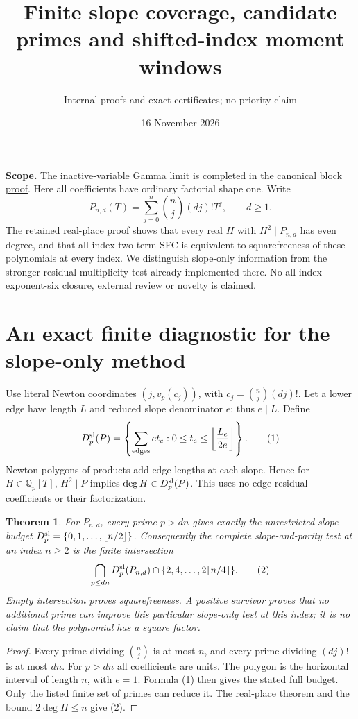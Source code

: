 \documentclass[11pt]{article}
\title{Finite slope coverage, candidate primes and shifted-index moment windows}
\author{Internal proofs and exact certificates; no priority claim}
\date{16 November 2026}
\newtheorem{theorem}{Theorem}
\newcommand{\Q}{\mathbb Q}
\newcommand{\vp}{v_p}
\begin{document}
\maketitle
\noindent\textbf{Scope.}
The inactive-variable Gamma limit is completed in the
\href{COUPLED_BLOCK_PERIODS.tex}{canonical block proof}.
Here all coefficients have ordinary factorial shape one. Write
\[
 P_{n,d}(T)=\sum_{j=0}^n\binom nj(dj)!T^j,\qquad d\ge1.
\]
The \href{MIXED_PRIME_RESIDUAL_WINDOWS.tex}{retained real-place proof}
shows that every real $H$ with $H^2\mid P_{n,d}$ has even degree,
and that all-index two-term SFC is equivalent to squarefreeness of
these polynomials at every index. We distinguish slope-only information
from the stronger residual-multiplicity test already implemented there.
No all-index exponent-six closure, external review or novelty is claimed.

\section{An exact finite diagnostic for the slope-only method}
Use literal Newton coordinates $(j,\vp(c_j))$, with
$c_j=\binom nj(dj)!$. Let a lower edge have length $L$ and reduced
slope denominator $e$; thus $e\mid L$. Define
\[
 D_p^{\rm sl}(P)=\left\{\sum_{\rm edges}e t_e:
          0\le t_e\le\left\lfloor\frac{L_e}{2e}\right\rfloor\right\}.
 \tag{1}
\]
Newton polygons of products add edge lengths at each slope. Hence
for $H\in\Q_p[T]$, $H^2\mid P$ implies $\deg H\in D_p^{\rm sl}(P)$.
This uses no edge residual coefficients or their factorization.

\begin{theorem}\label{thm:cap}
For $P_{n,d}$, every prime $p>dn$ gives exactly the unrestricted slope
budget $D_p^{\rm sl}=\{0,1,\ldots,\lfloor n/2\rfloor\}$.
Consequently the complete slope-and-parity test at an index $n\ge2$
is the finite intersection
\[
 \bigcap_{p\le dn}D_p^{\rm sl}(P_{n,d})
 \cap\{2,4,\ldots,2\lfloor n/4\rfloor\}. \tag{2}
\]
Empty intersection proves squarefreeness. A positive survivor proves
that no additional prime can improve this particular slope-only test
at this index; it is no claim that the polynomial has a square factor.
\end{theorem}
\begin{proof}
Every prime dividing $\binom nj$ is at most $n$, and every prime
dividing $(dj)!$ is at most $dn$. For $p>dn$ all coefficients are
units. The polygon is the horizontal interval of length $n$, with
$e=1$. Formula (1) then gives the stated full budget. Only the listed
finite set of primes can reduce it. The real-place theorem and the
bound $2\deg H\le n$ give (2).
\end{proof}
\end{document}
